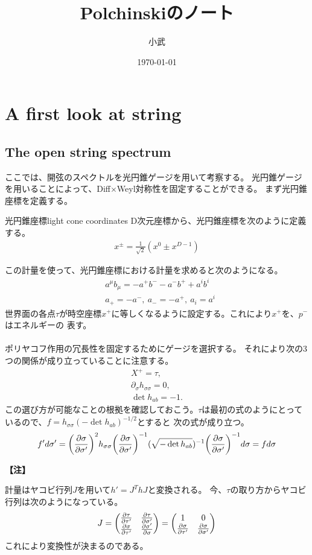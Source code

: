 \documentclass[11pt, dvipdfmx]{article}
\numberwithin{equation}{section}
\newenvironment{note}{
    \vspace{1ex} %
    \par\footnotesize\noindent\textbf{【注】}
}{
    \par\vspace{1ex} %
}
\begin{document}
\title{Polchinskiのノート}
\author{小武}
\date{\today}
\maketitle
\section{A first look at string}
\subsection{The open string spectrum}
ここでは、開弦のスペクトルを光円錐ゲージを用いて考察する。
光円錐ゲージを用いることによって、Diff$\times$Weyl対称性を固定することができる。
まず光円錐座標を定義する。
\begin{mydef}{光円錐座標}{light cone coordinates}
    D次元座標から、光円錐座標を次のように定義する。
\begin{align}
    x^\pm = \frac{1}{\sqrt{2}}(x^0 \pm x^{D-1})
\end{align}
\end{mydef}
この計量を使って、光円錐座標における計量を求めると次のようになる。
\begin{align}
    &a^\mu b_\mu=-a^+ b^--a^-b^+ + a^i b^i\\
    &a_+=-a^-,  \ a_-=-a^+, \ a_i=a^i
\end{align}
世界面の各点$\tau$が時空座標$x^+$に等しくなるように設定する。これにより$x^+$を、$p^-$はエネルギーの
表す。
\\\\
ポリヤコフ作用の冗長性を固定するためにゲージを選択する。
それにより次の3つの関係が成り立っていることに注意する。
\begin{align}
    X^+=\tau,\label{gauge cond. 1}\\
    \partial_\sigma h_{\sigma\sigma}=0,\label{gauge cond. 2}\\
    \det h_{ab}=-1.\label{gauge cond. 3}
\end{align}
この選び方が可能なことの根拠を確認しておこう。$\tau$は最初の式のようにとっているので、$f=h_{\sigma\sigma}(-\det h_{ab})^{-1/2}$とすると
次の式が成り立つ。
\begin{align}
    f'd\sigma'=\qty(\pdv{\sigma}{\sigma'})^2h_{\sigma\sigma}\qty(\pdv{\sigma}{\sigma'})^{-1}(\sqrt{-\det h_{ab}})^{-1}\qty(\pdv{\sigma}{\sigma'})^{-1}d\sigma=fd\sigma
\end{align}
\begin{note}
計量はヤコビ行列$J$を用いて$h'=J^ThJ$と変換される。
今、$\tau$の取り方からヤコビ行列は次のようになっている。
\begin{align}
    J=\mqty(\pdv{\tau}{\tau'} & \pdv{\tau}{\sigma'} \\ \pdv{\sigma}{\tau'} & \pdv{\sigma'}{\sigma})=\mqty(1 & 0 \\ \pdv{\sigma}{\tau'} & \pdv{\sigma}{\sigma'})
\end{align}
これにより変換性が決まるのである。
\end{note}
\end{document}
